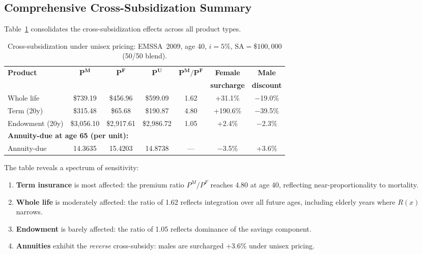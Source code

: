 \documentclass[12pt,a4paper]{article}
\newcommand{\SA}{\text{SA}}
\begin{document}
\subsection{Comprehensive Cross-Subsidization Summary}
\label{subsec:cross-subsidy-summary}

Table~\ref{tab:cross-subsidy-all} consolidates the cross-subsidization effects
across all product types.

\begin{table}[H]
\centering
\small
\caption{Cross-subsidization under unisex pricing: EMSSA~2009, age 40,
$i = 5\%$, $\SA = \$100{,}000$ (50/50 blend).}
\label{tab:cross-subsidy-all}
\begin{tabular}{lcccccc}
\toprule
\textbf{Product} & $\bm{P^M}$ & $\bm{P^F}$ & $\bm{P^U}$ &
$\bm{P^M/P^F}$ & \textbf{Female} & \textbf{Male} \\
 & & & & & \textbf{surcharge} & \textbf{discount} \\
\midrule
Whole life & \$739.19 & \$456.96 & \$599.09 & 1.62 & +31.1\% & $-$19.0\% \\
Term (20y) & \$315.48 & \$65.68 & \$190.87 & 4.80 & +190.6\% & $-$39.5\% \\
Endowment (20y) & \$3,056.10 & \$2,917.61 & \$2,986.72 & 1.05 & +2.4\% & $-$2.3\% \\
\midrule
\multicolumn{7}{l}{\textbf{Annuity-due at age 65 (per unit):}} \\
Annuity-due & 14.3635 & 15.4203 & 14.8738 & --- & $-$3.5\% & +3.6\% \\
\bottomrule
\end{tabular}
\end{table}

The table reveals a spectrum of sensitivity:
\begin{enumerate}
  \item \textbf{Term insurance} is most affected: the premium ratio $P^M/P^F$
        reaches 4.80 at age 40, reflecting near-proportionality to mortality.
  \item \textbf{Whole life} is moderately affected: the ratio of 1.62 reflects
        integration over all future ages, including elderly years where $R(x)$ narrows.
  \item \textbf{Endowment} is barely affected: the ratio of 1.05 reflects
        dominance of the savings component.
  \item \textbf{Annuities} exhibit the \emph{reverse} cross-subsidy: males
        are surcharged +3.6\% under unisex pricing.
\end{enumerate}
\end{document}

